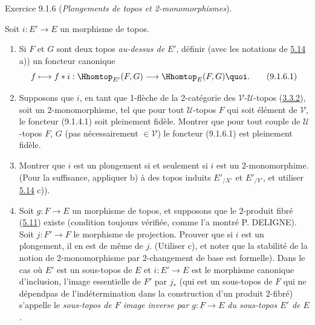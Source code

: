 \begin{enonce*}[remark]{Exercice 9.1.6}
(\emph{Plongements de topos et 2-monomorphismes}).

Soit $i:E'\rightarrow E$ un morphisme de topos.

\begin{enumerate}
\renewcommand{\theenumi}{\alph{enumi}}
\renewcommand{\labelenumi}{\theenumi)}
\item Si $F$ et $G$ sont deux topos \emph{au-dessus de} $E'$, définir
(avec les notations de \hyperref[IV.exer5.14]{5.14} a)) un foncteur canonique
\begin{equation*}
f\longmapsto f\ast i:\Hhomtop_{E'}(F,G)\longrightarrow
\Hhomtop_E(F,G){\quoi}.\tag{9.1.6.1}
\end{equation*}

\item Supposons que $i$, en tant que 1-flèche de la 2-catégorie des
$𝒱\text{-}𝒰$-topos (\hyperref[IV.subsubsec3.3.2]{3.3.2}), soit
un $2$-monomorphisme, \ie tel que pour tout $𝒰$-topos $F$ qui
soit élément de $𝒱$, le foncteur (9.1.4.1) soit pleinement %
fidèle. Montrer que pour tout couple de $𝒰$-topos $F$, $G$
(pas nécessairement $\in 𝒱$) le foncteur (9.1.6.1) est %
pleinement fidèle.

\item Montrer que $i$ est un plongement si et seulement si $i$ est un
$2$-monomorphime. (Pour la suffisance, appliquer b) à des topos
induits $E'_{/X'}$ et $E'_{/Y'}$, et utiliser \hyperref[IV.exer5.14]{5.14} c)).

\item Soit $g:F\rightarrow E$ un morphisme de topos, et supposons que
le $2$-produit fibré (\hyperref[IV.prop5.11]{5.11}) 
existe (condition toujours vérifiée, comme l'a montré P. DELIGNE).
Soit $j:F'\rightarrow F$ le morphisme de projection. Prouver que si
$i$ est un plongement, il en est de même de $j$. (Utiliser c), et
noter que la stabilité de la notion de 2-monomorphisme par
2-changement de base est formelle). Dans le cas où $E'$ est un
sous-topos de $E$ et $i:E'\rightarrow E$ est le morphisme canonique
d'inclusion, l'image essentielle de $F'$ par $j_{\ast}$ (qui est un
sous-topos de $F$ qui ne dépend\pageoriginale pas de
l'indétermination dans la construction d'un produit 2-fibré)
s'appelle le \emph{sous-topos de $F$ image inverse par
$g:F\rightarrow E$ du sous-topos $E'$ de $E$.}


\end{enumerate}
\end{enonce*}
